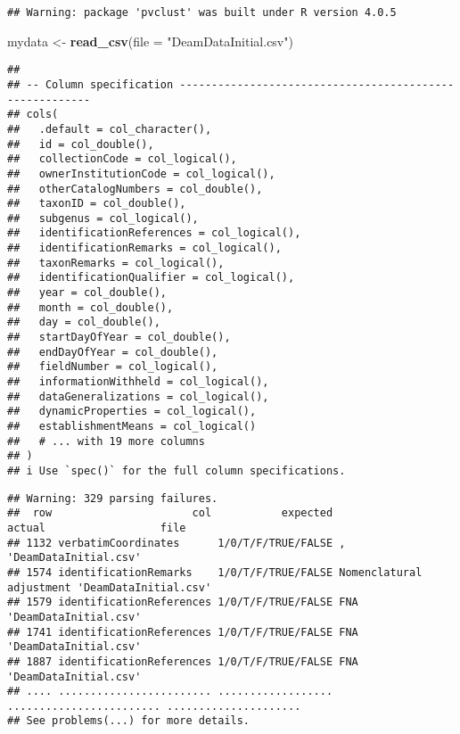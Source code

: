 \documentclass[
]{article}
\newenvironment{Shaded}{\begin{snugshade}}{\end{snugshade}}
\newcommand{\DataTypeTok}[1]{\textcolor[rgb]{0.13,0.29,0.53}{#1}}
\newcommand{\KeywordTok}[1]{\textcolor[rgb]{0.13,0.29,0.53}{\textbf{#1}}}
\newcommand{\NormalTok}[1]{#1}
\newcommand{\StringTok}[1]{\textcolor[rgb]{0.31,0.60,0.02}{#1}}
\begin{document}
\begin{verbatim}
## Warning: package 'pvclust' was built under R version 4.0.5
\end{verbatim}

\begin{Shaded}
\begin{Highlighting}[]
\NormalTok{mydata <-}\StringTok{ }\KeywordTok{read_csv}\NormalTok{(}\DataTypeTok{file =} \StringTok{"DeamDataInitial.csv"}\NormalTok{)}
\end{Highlighting}
\end{Shaded}

\begin{verbatim}
## 
## -- Column specification --------------------------------------------------------
## cols(
##   .default = col_character(),
##   id = col_double(),
##   collectionCode = col_logical(),
##   ownerInstitutionCode = col_logical(),
##   otherCatalogNumbers = col_double(),
##   taxonID = col_double(),
##   subgenus = col_logical(),
##   identificationReferences = col_logical(),
##   identificationRemarks = col_logical(),
##   taxonRemarks = col_logical(),
##   identificationQualifier = col_logical(),
##   year = col_double(),
##   month = col_double(),
##   day = col_double(),
##   startDayOfYear = col_double(),
##   endDayOfYear = col_double(),
##   fieldNumber = col_logical(),
##   informationWithheld = col_logical(),
##   dataGeneralizations = col_logical(),
##   dynamicProperties = col_logical(),
##   establishmentMeans = col_logical()
##   # ... with 19 more columns
## )
## i Use `spec()` for the full column specifications.
\end{verbatim}

\begin{verbatim}
## Warning: 329 parsing failures.
##  row                      col           expected                   actual                  file
## 1132 verbatimCoordinates      1/0/T/F/TRUE/FALSE ,                        'DeamDataInitial.csv'
## 1574 identificationRemarks    1/0/T/F/TRUE/FALSE Nomenclatural adjustment 'DeamDataInitial.csv'
## 1579 identificationReferences 1/0/T/F/TRUE/FALSE FNA                      'DeamDataInitial.csv'
## 1741 identificationReferences 1/0/T/F/TRUE/FALSE FNA                      'DeamDataInitial.csv'
## 1887 identificationReferences 1/0/T/F/TRUE/FALSE FNA                      'DeamDataInitial.csv'
## .... ........................ .................. ........................ .....................
## See problems(...) for more details.
\end{verbatim}
\end{document}
